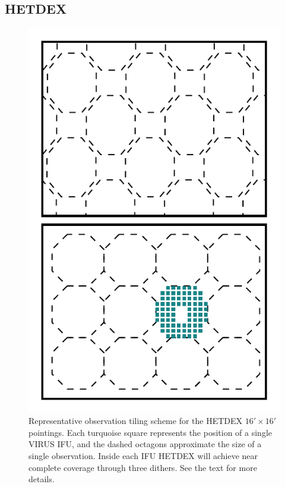 \documentclass[fleqn,usenatbib]{mnras}
\begin{document}
\subsection{HETDEX}\label{sec: hetdex}
\begin{figure}
\includegraphics[width=\columnwidth]{figures/pointings.pdf} 
	\caption[HETDEX pointing strategy.]{Representative observation tiling scheme for the HETDEX $16' \times 16'$ pointings. Each turquoise square represents the position of a single VIRUS IFU, and the dashed octagons approximate the size of a single observation. Inside each IFU HETDEX will achieve near complete coverage through three dithers. See the text for more details.} 
	\label{fig: ifu layout} 
\end{figure}
\end{document}
